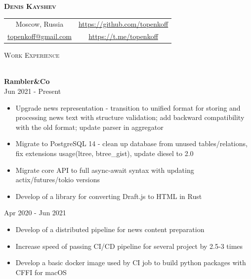 \documentclass[a4paper]{article}
\newcommand{\lineunder} {
    \vspace*{-8pt} \\
    \hspace*{-18pt} \hrulefill \\
}
\newcommand{\header} [1] {
    {\hspace*{-18pt}\vspace*{6pt} \textsc{#1}}
    \vspace*{-6pt} \lineunder
}
\begin{document}
\vspace*{-40pt}

\vspace*{-10pt}
\begin{center}
    \textbf{{\huge \scshape {Denis Kayshev}}}\\
    \vspace*{10pt}
    \begin{tabular}{c c}
        Moscow, Russia & \url{https://github.com/topenkoff} \\
        \href{mailto:topenkoff@gmail.com}{topenkoff@gmail.com} & \url{https://t.me/topenkoff} \\
    \end{tabular}
    \vspace*{15pt}
\end{center}

\header{Work Experience}
\vspace{1mm}

\textbf{Rambler\&Co} \\
 \hfill Jun 2021 - Present\\
\vspace{-1mm}
\begin{itemize} \itemsep -1pt
	\item Upgrade news representation - transition to unified format for storing and processing news text with structure validation; add backward compatibility with the old format; update parser in aggregator
	\item Migrate to PostgreSQL 14 - clean up database from unused tables/relations, fix extensions usage(ltree, btree\_gist), update diesel to 2.0
	\item Migrate core API to full async-await syntax with updating actix/futures/tokio versions
	\item Develop of a library for converting Draft.js to HTML in Rust
\end{itemize}
 \hfill Apr 2020 - Jun 2021\\
\begin{itemize} \itemsep -1pt
	\item Develop of a distributed pipeline for news content preparation
	\item Increase speed of passing CI/CD pipeline for several project by 2.5-3 times
	\item Develop a basic docker image used by CI job to build python packages with CFFI for macOS
\end{itemize}
\end{document}
